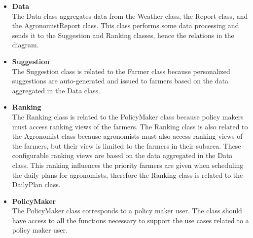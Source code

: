 \begin{flushleft}
\begin{itemize}
\item \textbf{Data}\\
The Data class aggregates data from the Weather class, the Report class, and the AgronomistReport class. This class performs some data processing and sends it to the Suggestion and Ranking classes, hence the relations in the diagram. 

\item \textbf{Suggestion}\\
The Suggestion class is related to the Farmer class because personalized suggestions are auto-generated and issued to farmers based on the data aggregated in the Data class.

\item \textbf{Ranking}\\
The Ranking class is related to the PolicyMaker class because policy makers must access ranking views of the farmers. The Ranking class is also related to the Agronomist class because agronomists must also access ranking views of the farmers, but their view is limited to the farmers in their subarea. These configurable ranking views are based on the data aggregated in the Data class. This ranking influences the priority farmers are given when scheduling the daily plans for agronomists, therefore the Ranking class is related to the DailyPlan class.

\item \textbf{PolicyMaker}\\
The PolicyMaker class corresponds to a policy maker user. The class should have access to all the functions necessary to support the use cases related to a policy maker user. 

\end{itemize}
\end{flushleft}



